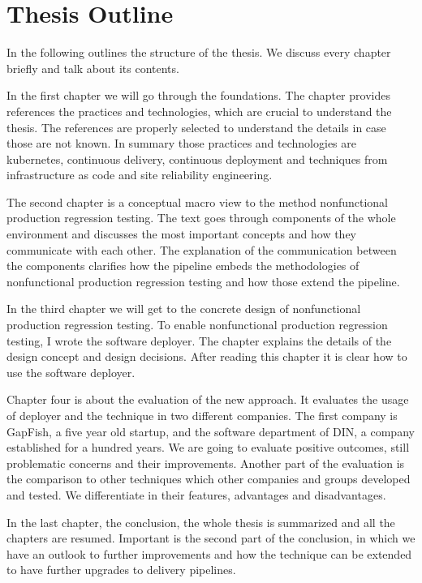 \section{Thesis Outline}

In the following outlines the structure of the thesis. We discuss every chapter briefly
and talk about its contents.

In the first chapter we will go through the foundations. The chapter provides references
the practices and technologies, which are crucial to understand the thesis. The references
are properly selected to understand the details in case those are not known. In summary
those practices and technologies are kubernetes, continuous delivery, continuous
deployment and techniques from infrastructure as code and site reliability engineering.

The second chapter is a conceptual macro view to the method nonfunctional production
regression testing. The text goes through components of the whole environment and
discusses the most important concepts and how they communicate with each other. The
explanation of the communication between the components clarifies how the pipeline embeds
the methodologies of nonfunctional production regression testing and how those extend the
pipeline.

In the third chapter we will get to the concrete design of nonfunctional production
regression testing. To enable nonfunctional production regression testing, I wrote the
software deployer.  The chapter explains the details of the design concept and design
decisions. After reading this chapter it is clear how to use the software deployer.

Chapter four is about the evaluation of the new approach. It evaluates the usage of
deployer and the technique in two different companies. The first company is GapFish, a
five year old startup, and the software department of DIN, a company established for a
hundred years. We are going to evaluate positive outcomes, still problematic concerns and
their improvements. Another part of the evaluation is the comparison to other techniques
which other companies and groups developed and tested. We differentiate in their features,
advantages and disadvantages.

In the last chapter, the conclusion, the whole thesis is summarized and all the chapters
are resumed. Important is the second part of the conclusion, in which we have an outlook
to further improvements and how the technique can be extended to have further upgrades to
delivery pipelines.

